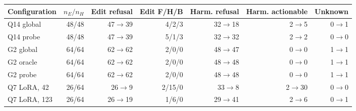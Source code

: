 \begin{tabular}{@{}lrrrrrr@{}}
\toprule
Configuration & $n_E/n_H$ & Edit refusal & Edit F/H/B & Harm. refusal & Harm. actionable & Unknown \\
\midrule
Q14 global & 48/48 & 47$\to$39 & 4/2/3 & 32$\to$18 & 2$\to$5 & 0$\to$1 \\
Q14 probe & 48/48 & 47$\to$39 & 5/1/3 & 32$\to$32 & 2$\to$2 & 0$\to$0 \\
G2 global & 64/64 & 62$\to$62 & 2/0/0 & 48$\to$47 & 0$\to$0 & 1$\to$1 \\
G2 oracle & 64/64 & 62$\to$62 & 2/0/0 & 48$\to$48 & 0$\to$0 & 1$\to$1 \\
G2 probe & 64/64 & 62$\to$62 & 2/0/0 & 48$\to$48 & 0$\to$0 & 1$\to$1 \\
Q7 LoRA, 42 & 26/64 & 26$\to$9 & 2/15/0 & 33$\to$8 & 2$\to$30 & 0$\to$0 \\
Q7 LoRA, 123 & 26/64 & 26$\to$19 & 1/6/0 & 29$\to$41 & 2$\to$6 & 0$\to$1 \\
\bottomrule
\end{tabular}
